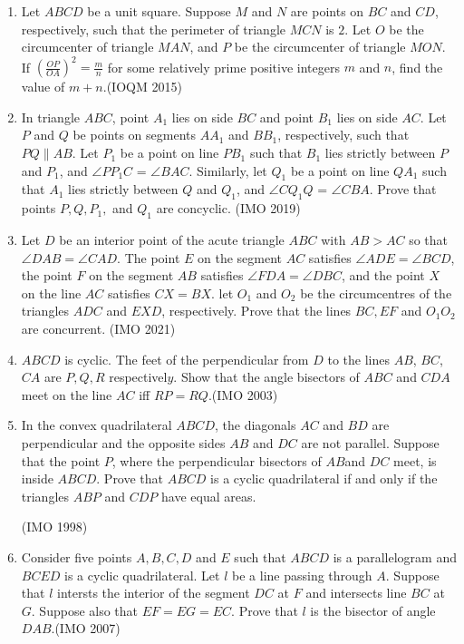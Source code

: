 \begin{enumerate}[label=\thesubsection.\arabic*,ref=\thesubsection.\theenumi]
    \item Let $ABCD$ be a unit square. Suppose $M$ and $N$ are points on $BC$ and $CD$, respectively, such that the perimeter of triangle $MCN$ is $2$. Let $O$ be the circumcenter of triangle $MAN$, and $P$ be the circumcenter of triangle $MON$. If $\left(\frac{OP}{OA}\right)^2 = \frac{m}{n}$ for some relatively prime positive integers $m$ and $n$, find the value of $m + n$.\hfill(IOQM 2015)
    
    \item In triangle  $ABC$, point $ A_1 $ lies on side $ BC $ and point $B_1$ lies on side $ AC $. Let  $P$ and $ Q $ be points on segments 
$AA_1$ and $BB_1 $, respectively, such that   $PQ \parallel AB$.
Let
 $P_1$ be a point on line  $PB_1$ such that $B_1$ lies strictly between 
$P$ and $P_1$, and $\angle PP_1C$ = $\angle BAC$. Similarly, let $Q_1$ 
be a point on line $QA_1$ such that $A_1$ lies strictly between $Q$ and 
$Q_1$, and $ \angle CQ_1Q$ = $\angle CBA $.
Prove that points $P, Q, P_1,$ and $Q_1$ are concyclic.
\hfill(IMO 2019)


\item Let $D$ be an interior point of the acute triangle $ABC$ with $AB > AC$ so that $\angle DAB = \angle CAD$. The point $E$ on the segment $AC$ satisfies $\angle ADE=\angle BCD$, the point $F$ on the segment $AB$ satisfies $\angle FDA=\angle DBC$, and the point $X$ on the line $AC$ satisfies $CX=BX$. let $O_{1}$ and $O_{2}$ be the circumcentres of the triangles $ADC$ and $EXD$, respectively. Prove that the lines $BC,EF$ and $O_{1} O_{2}$ are concurrent.
 \hfill(IMO 2021)

\item $ABCD$ is cyclic. The feet of the perpendicular from $D$ to the lines $AB$, $BC$, $CA$ are $P, Q,R $ respectivel$y$. Show that the angle bisectors of $ ABC$ and $CDA$ meet on the line $AC$ iff $RP = RQ$.\hfill(IMO 2003)
%
\item In the convex quadrilateral $ABCD$, the diagonals $AC$ and $BD$ are perpendicular and the opposite sides $AB$ and $DC$ are not parallel. Suppose that the point $P$, where the perpendicular bisectors of $AB$and $DC$ meet, is inside $ABCD$. Prove that $ABCD$ is a cyclic quadrilateral if and only if the triangles $ABP$ and $CDP$ have equal areas.

	\hfill(IMO  1998) 
\item Consider five points $A,B,C,D$ and $E$ such that $ABCD$ is a parallelogram and $BCED$ is a cyclic quadrilateral. Let $l$ be a line passing through $A$. Suppose that $l$ intersts the interior of the segment $DC$ at $F$ and intersects line $BC$ at $G$. Suppose also that $EF=EG=EC$. Prove that $l$ is the bisector of angle $DAB$.\hfill(IMO  2007)
		

\end{enumerate}
